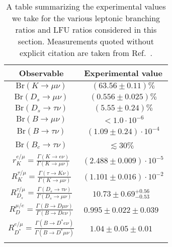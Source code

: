 \begin{table}[t]
  \centering
  \begin{tabular}{cc}
    \toprule
    Observable & Experimental value \\
    \midrule
    $\text{Br}(K\to\mu\nu)$       & $(63.56 \pm 0.11) \%$  \\
    $\text{Br}(D_s \to \mu \nu)$  & $(0.556 \pm 0.025) \%$ \\
    $\text{Br}(D_s \to \tau \nu)$ & $(5.55 \pm 0.24) \%$   \\
    $\text{Br}(B \to \mu \nu)$    & $< 1.0 \cdot 10^{-6}$  \\
    $\text{Br}(B \to \tau \nu)$   & $(1.09 \pm 0.24) \cdot 10^{-4}$ \\
    $\text{Br}(B_c \to \tau \nu)$   & $\lesssim 30 \%$~\cite{Alonso:2016oyd} \\
    \arrayrulecolor{black!30}\midrule
    $r_K^{e/\mu} = \frac{\Gamma(K \to e\nu)}{\Gamma(K\to \mu\nu)}$ & $(2.488 \pm 0.009) \cdot 10^{-5}$\\
    $R_{K}^{\tau/\mu} = \frac{\Gamma(\tau \to K\nu)}{\Gamma(K\to \mu\nu)}$ & $(1.101 \pm 0.016) \cdot 10^{-2}$\\
    $R_{D_s}^{\tau/\mu} = \frac{\Gamma(D_s \to \tau\nu)}{\Gamma(D_s\to \mu\nu)}$ & $10.73 \pm 0.69^{+0.56}_{-0.53}$~\cite{Zupanc:2013byn}\\
    $R_D^{\mu/e} = \frac{\Gamma(B \to D \mu \nu)}{\Gamma(B \to D e \nu)}$ & $0.995 \pm 0.022 \pm
0.039$~\cite{Glattauer:2015teq}\\
    $R_{D^*}^{e/\mu} = \frac{\Gamma(B \to D^* e \nu)}{\Gamma(B \to D^* \mu \nu)}$ & $1.04 \pm 0.05 \pm 0.01$~\cite{Abdesselam:2017kjf}\\
    \arrayrulecolor{black!100}\bottomrule
  \end{tabular}
  \caption[A table summarizing the experimental values we take for the various
    leptonic branching ratios and LFU ratios considered in this section.]{A table summarizing the experimental values we take for the various
    leptonic branching ratios and LFU ratios considered in this section.
    Measurements quoted without explicit citation are taken from
    Ref.~\cite{Olive:2016xmw}.}
    \label{tbl:ch3-decays}
\end{table}

